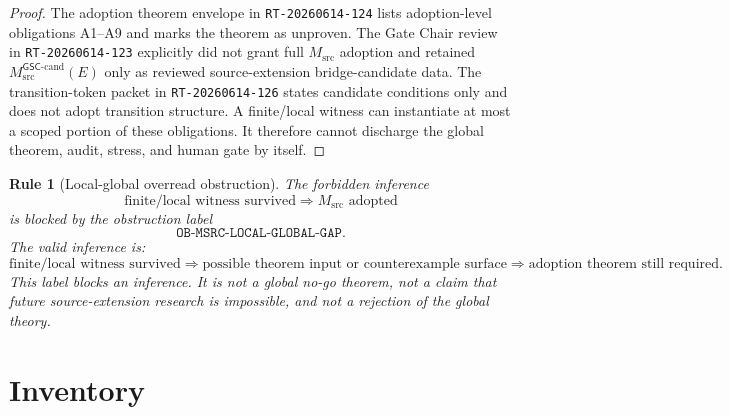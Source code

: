 \documentclass[11pt]{article}
\newcommand{\GSC}{\mathsf{GSC}}
\newcommand{\Msrc}{M_{\mathrm{src}}}
\newcommand{\Mgsccand}{M_{\mathrm{src}}^{\GSC\mbox{-}\mathrm{cand}}}
\newtheorem{rulebox}{Rule}
\begin{document}
\begin{proof}
The adoption theorem envelope in \texttt{RT-20260614-124} lists adoption-level
obligations A1--A9 and marks the theorem as unproven. The Gate Chair review in
\texttt{RT-20260614-123} explicitly did not grant full \(\Msrc\) adoption and
retained \(\Mgsccand(E)\) only as reviewed source-extension bridge-candidate
data. The transition-token packet in \texttt{RT-20260614-126} states candidate
conditions only and does not adopt transition structure. A finite/local
witness can instantiate at most a scoped portion of these obligations. It
therefore cannot discharge the global theorem, audit, stress, and human gate
by itself.
\end{proof}

\begin{rulebox}[Local-global overread obstruction]
The forbidden inference
\[
  \text{finite/local witness survived} \Longrightarrow \Msrc
  \text{ adopted}
\]
is blocked by the obstruction label
\[
  \texttt{OB-MSRC-LOCAL-GLOBAL-GAP}.
\]
The valid inference is:
\[
  \text{finite/local witness survived}
  \Longrightarrow
  \text{possible theorem input or counterexample surface}
  \Longrightarrow
  \text{adoption theorem still required}.
\]
This label blocks an inference. It is not a global no-go theorem, not a claim
that future source-extension research is impossible, and not a rejection of
the global theory.
\end{rulebox}

\section{Inventory}
\end{document}
